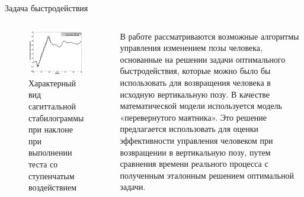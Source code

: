 \documentclass[10pt]{beamer}
\begin{document}
\begin{frame}{Задача быстродействия}
	\begin{columns}
		\begin{figure}[h!]
			\includegraphics[width=1\linewidth]{images/stabilos.png}
			\caption{Характерный вид сагиттальной стабилограммы при наклоне при выполнении теста со ступенчатым
			 воздействием}
		\end{figure}
		В работе рассматриваются возможные алгоритмы управления изменением
		позы человека, основанные на решении задачи оптимального быстродействия,
		которые можно было бы использовать для возвращения человека в исходную 
		вертикальную позу. В качестве математической модели используется модель
		«перевернутого маятника». Это решение предлагается использовать для
		оценки эффективности управления человеком при возвращении в
		вертикальную позу, путем сравнения времени реального процесса с полученным
		эталонным решением оптимальной задачи.
	\end{columns}
\end{frame}
\end{document}
